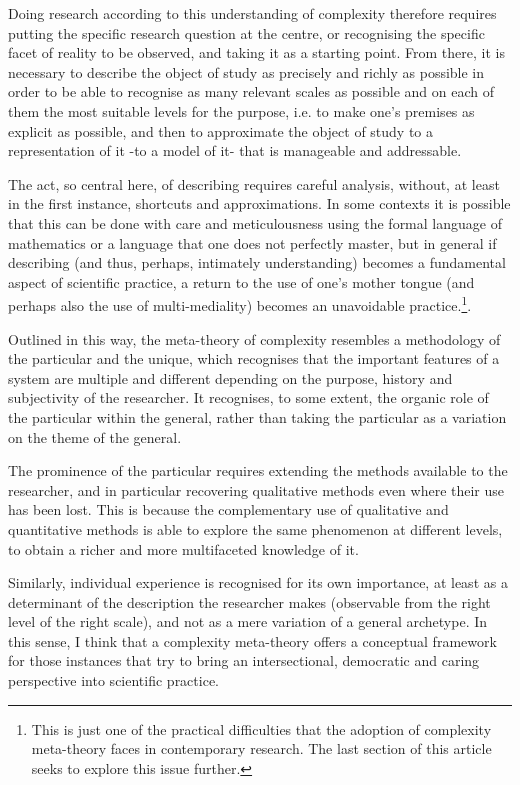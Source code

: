 \documentclass[a4paper, headings=standardclasses]{scrartcl}
\begin{document}
Doing research according to this understanding of complexity therefore requires putting the specific research question at the centre, or recognising the specific facet of reality to be observed, and taking it as a starting point.
From there, it is necessary to describe the object of study as precisely and richly as possible in order to be able to recognise as many relevant scales as possible and on each of them the most suitable levels for the purpose, i.e. to make one's premises as explicit as possible, and then to approximate the object of study to a representation of it -to a model of it- that is manageable and addressable.

The act, so central here, of describing requires careful analysis, without, at least in the first instance, shortcuts and approximations. In some contexts it is possible that this can be done with care and meticulousness using the formal language of mathematics or a language that one does not perfectly master, but in general if describing (and thus, perhaps, intimately understanding) becomes a fundamental aspect of scientific practice, a return to the use of one's mother tongue (and perhaps also the use of multi-mediality) becomes an unavoidable practice.\footnote{This is just one of the practical difficulties that the adoption of complexity meta-theory faces in contemporary research. The last section of this article seeks to explore this issue further.}.

Outlined in this way, the meta-theory of complexity resembles a methodology of the particular and the unique, which recognises that the important features of a system are multiple and different depending on the purpose, history and subjectivity of the researcher. It recognises, to some extent, the organic role of the particular within the general, rather than taking the particular as a variation on the theme of the general. 

The prominence of the particular requires extending the methods available to the researcher, and in particular recovering qualitative methods even where their use has been lost. This is because the complementary use of qualitative and quantitative methods is able to explore the same phenomenon at different levels, to obtain a richer and more multifaceted knowledge of it.

Similarly, individual experience is recognised for its own importance, at least as a determinant of the description the researcher makes (observable from the right level of the right scale), and not as a mere variation of a general archetype. 
In this sense, I think that a complexity meta-theory offers a conceptual framework for those instances that try to bring an intersectional, democratic and caring perspective into scientific practice.
\end{document}
